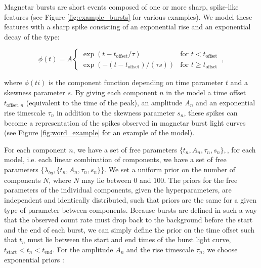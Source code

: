 \documentclass[12pt]{emulateapj}
\newcommand{\given}{\,|\,}
\newcommand{\dd}{\mathrm{d}}
\newcommand{\counts}{y}
\newcommand{\pars}{\theta}
\newcommand{\mean}{\lambda}
\newcommand{\Poisson}{{\mathcal P}}
\newcommand{\bg}{\mathrm{bg}}
\newcommand{\word}{\phi}
\begin{document}
Magnetar bursts are short events composed of one or more sharp, spike-like features (see Figure \ref{fig:example_bursts} for various examples). We model these features
with a sharp spike consisting of an exponential rise and an exponential decay of the type:


\begin{equation}
\word(t) = A \left\{\begin{array}{ll}\exp(t-t_{\mathrm{offset}}/\tau) & \mbox{for $t < t_{\mathrm{offset}}$}\\ 
\exp(-(t-t_{\mathrm{offset}})/(\tau s)) & \mbox{for $t \geq t_\mathrm{offset}$}\end{array}\right. \, ,
\label{eqn:word}
\end{equation}

where $\word(ti)$ is the component function depending on time parameter $t$ and a skewness
parameter $s$. By giving each component $n$ in the model a time offset $t_{\mathrm{offset},n}$ (equivalent to the time of the peak), 
an amplitude $A_n$ and an exponential rise timescale $\tau_n$ in addition to the skewness parameter $s_n$, 
these spikes can become a representation of the spikes observed in magnetar burst light curves (see Figure \ref{fig:word_example}
for an example of the model).



For each component $n$, we have a set of free parameters $\{t_n, A_n, \tau_n, s_n \},$, for each model, i.e. each
linear combination of components, we have a set of free parameters $\{\mean_{bg}, \{t_n, A_n, \tau_n, s_n\} \}$.
We set a uniform prior on the number of components $N$, where $N$ may lie between $0$ and $100$. 
The priors for the free parameters of the individual components, given the hyperparameters, are independent and identically distributed, such that priors 
are the same for a given type of parameter between components. 
Because bursts are defined in such a way that the observed count rate must drop back to the background before the
start and the end of each burst, we can simply define the prior on the time offset such that $t_n$ must lie between
the start and end times of the burst light curve, $t_{\mathrm{start}} < t_n < t_\mathrm{end}$. 
For the amplitude $A_n$ and the rise timescale $\tau_n$, we choose exponential priors \citep{skilling1998}:
\end{document}
